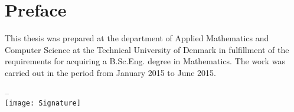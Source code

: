 \chapter{Preface}
This thesis was prepared at the department of Applied Mathematics and Computer Science at the Technical University of Denmark in fulfillment of the requirements for acquiring a B.Sc.Eng. degree in Mathematics. The work was carried out in the period from January 2015 to June 2015.

\vfill

{
\centering
    \thesislocation{} – \thesisdeadline{}\\[1cm]
    \hspace{3cm}\texttt{[image: Signature]}\\[1cm]
\begin{flushright}
    \thesisauthor{}
\end{flushright}
}